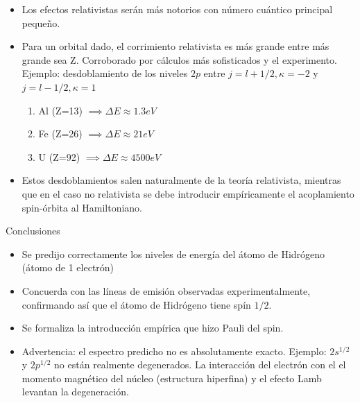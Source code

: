 \documentclass{beamer}
\begin{document}
\begin{frame}
 \begin{itemize}
  \item Los efectos relativistas ser\'an m\'as notorios con n\'umero cu\'antico principal peque\~no.
    \vspace{3mm}
  \item Para un orbital dado, el corrimiento relativista es m\'as grande entre m\'as grande sea Z. Corroborado por c\'alculos m\'as sofisticados y el experimento. \\
  Ejemplo: desdoblamiento de los niveles $2p$ entre $j=l+1/2, \kappa = -2$ y $j=l-1/2, \kappa = 1$
  \begin{enumerate}
   \item Al (Z=13) $\implies \Delta E \approx 1.3 eV$
   \item Fe (Z=26) $\implies \Delta E \approx 21 eV$
   \item U (Z=92) $\implies \Delta E \approx 4500 eV$
  \end{enumerate}
  \vspace{3mm}
  \item Estos desdoblamientos salen naturalmente de la teor\'ia relativista, mientras que en el caso no relativista se debe introducir emp\'iricamente el acoplamiento spin-\'orbita al Hamiltoniano.

 
  \end{itemize}

\end{frame}

\begin{frame}{Conclusiones}

\begin{itemize}
 \item  Se predijo correctamente los niveles de energ\'ia del \'atomo de Hidr\'ogeno (\'atomo de 1 electr\'on)
  \vspace{1mm}
 \item Concuerda con las l\'ineas de emisi\'on observadas experimentalmente, confirmando as\'i que el \'atomo de Hidr\'ogeno tiene sp\'in $1/2$.
 \vspace{1mm}
 \item Se formaliza la introducci\'on emp\'irica que hizo Pauli del spin.
 \vspace{1mm}
 \item Advertencia: el espectro predicho no es absolutamente exacto. Ejemplo: $2s^{1/2}  $ y $2p^{1/2}$ no est\'an realmente degenerados. La interacci\'on del electr\'on con el el momento magn\'etico del n\'ucleo (estructura hiperfina) y el efecto Lamb levantan la degeneraci\'on.
\end{itemize}

\end{frame}
\end{document}
